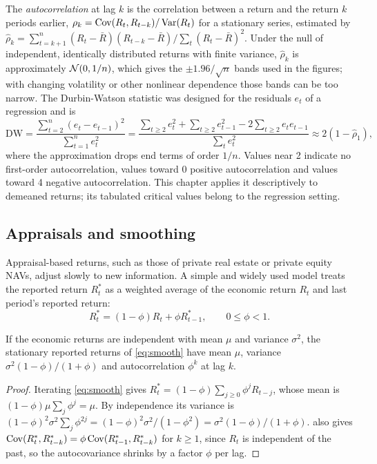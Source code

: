 \begin{chapterrefs}
The \emph{autocorrelation} at lag $k$ is the correlation between a return and the return $k$ periods
earlier, $\rho_k = \operatorname{Cov}(R_t,R_{t-k})/\operatorname{Var}(R_t)$ for a stationary series, estimated by
$\hat\rho_k = \sum_{t=k+1}^n(R_t-\bar R)(R_{t-k}-\bar R)/\sum_t(R_t-\bar R)^2$. Under the null of
independent, identically distributed returns with finite variance, $\hat\rho_k$ is approximately
$\mathcal{N}(0,1/n)$, which gives the $\pm1.96/\sqrt n$ bands used in the figures; with changing volatility or
other nonlinear dependence those bands can be too narrow. The Durbin-Watson statistic
\parencite{durbin1950} was designed for the residuals $e_t$ of a regression and is
\begin{equation}\label{eq:dw}
  \mathrm{DW} = \frac{\sum_{t=2}^n (e_t-e_{t-1})^2}{\sum_{t=1}^n e_t^2}
  = \frac{\sum_{t\ge2} e_t^2 + \sum_{t\ge2} e_{t-1}^2 - 2\sum_{t\ge2} e_te_{t-1}}{\sum_t e_t^2}
  \approx 2(1-\hat\rho_1),
\end{equation}
where the approximation drops end terms of order $1/n$. Values near 2 indicate no first-order
autocorrelation, values toward 0 positive autocorrelation and values toward 4 negative autocorrelation. This chapter applies it descriptively to demeaned returns;
its tabulated critical values belong to the regression setting.

\subsection{Appraisals and smoothing}

Appraisal-based returns, such as those of private real estate or private equity NAVs, adjust slowly
to new information. A simple and widely used model \parencite{geltner1993} treats the reported return
$R^*_t$ as a weighted average of the economic return $R_t$ and last period's reported return:
\begin{equation}\label{eq:smooth}
  R^*_t = (1-\phi)R_t + \phi R^*_{t-1},\qquad 0\le\phi<1 .
\end{equation}

\begin{proposition}\label{prop:smooth}
If the economic returns are independent with mean $\mu$ and variance $\sigma^2$, the stationary reported
returns of \cref{eq:smooth} have mean $\mu$, variance $\sigma^2(1-\phi)/(1+\phi)$ and
autocorrelation $\phi^k$ at lag $k$.
\end{proposition}
\begin{proof}
Iterating \cref{eq:smooth} gives $R^*_t = (1-\phi)\sum_{j\ge0}\phi^jR_{t-j}$, whose mean is
$(1-\phi)\mu\sum_j\phi^j = \mu$. By independence its variance is
$(1-\phi)^2\sigma^2\sum_j\phi^{2j} = (1-\phi)^2\sigma^2/(1-\phi^2) = \sigma^2(1-\phi)/(1+\phi)$.
 also gives $\operatorname{Cov}(R^*_t,R^*_{t-k}) = \phi\operatorname{Cov}(R^*_{t-1},R^*_{t-k})$ for $k\ge1$, since
$R_t$ is independent of the past, so the autocovariance shrinks by a factor $\phi$ per lag.
\end{proof}


\end{chapterrefs}
